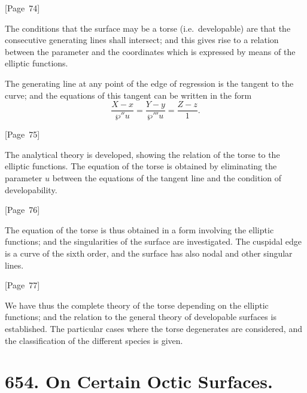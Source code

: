 \documentclass[11pt,a4paper]{book}
\begin{document}
\begin{center}
[Page~74]
\end{center}

The conditions that the surface may be a torse (i.e.\ developable) are
that the consecutive generating lines shall intersect; and this gives
rise to a relation between the parameter and the coordinates which is
expressed by means of the elliptic functions.

The generating line at any point of the edge of regression is the
tangent to the curve; and the equations of this tangent can be written
in the form
\[
\frac{X - x}{\wp'' u} = \frac{Y - y}{\wp''' u} = \frac{Z - z}{1}.
\]

\begin{center}
[Page~75]
\end{center}

The analytical theory is developed, showing the relation of the torse
to the elliptic functions. The equation of the torse is obtained by
eliminating the parameter $u$ between the equations of the tangent
line and the condition of developability.

\begin{center}
[Page~76]
\end{center}

The equation of the torse is thus obtained in a form involving the
elliptic functions; and the singularities of the surface are
investigated. The cuspidal edge is a curve of the sixth order, and
the surface has also nodal and other singular lines.

\begin{center}
[Page~77]
\end{center}

We have thus the complete theory of the torse depending on the
elliptic functions; and the relation to the general theory of
developable surfaces is established. The particular cases where the
torse degenerates are considered, and the classification of the
different species is given.


\newpage
\section*{654. On Certain Octic Surfaces.}
\end{document}

